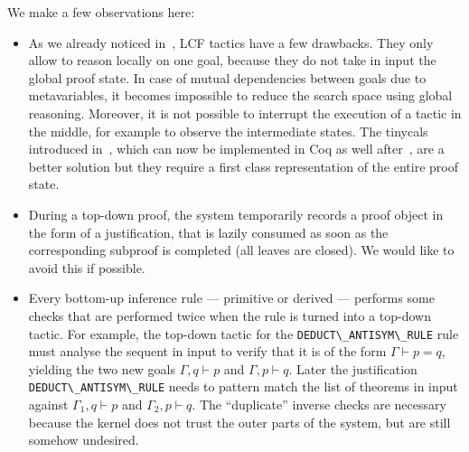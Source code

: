 \documentclass[preprint]{sigplanconf}
\begin{document}
We make a few observations here:
\begin{itemize}
\item As we already noticed in~\cite{??}, LCF tactics have a few drawbacks. They only allow to reason locally on one goal, because they do not take in input the global proof state. In case of mutual dependencies between goals due to metavariables, it becomes impossible to reduce the search space using global reasoning. Moreover, it is not possible to interrupt the execution of a tactic in the middle, for example to observe the intermediate states. The tinycals introduced in~\cite{??}, which can now be implemented in Coq as well after~\cite{??}, are a better solution but they require a first class representation of the entire proof state.
\item During a top-down proof, the system temporarily records a proof object in the form of a justification, that is lazily consumed as soon as the corresponding subproof is completed (all leaves are closed). We would like to avoid this if possible.
\item Every bottom-up inference rule --- primitive or derived --- performs some checks that are performed twice when the rule is turned into a top-down tactic.
For example, the top-down tactic for the \verb+DEDUCT\_ANTISYM\_RULE+ rule must analyse the sequent in input to verify that it is of the form $\Gamma \vdash p=q$, yielding the two new goals $\Gamma, q \vdash p$ and $\Gamma, p \vdash q$. Later the justification \verb+DEDUCT\_ANTISYM\_RULE+ needs to pattern match the list of theorems in input against $\Gamma_1,q \vdash p$ and $\Gamma_2,p \vdash q$. The ``duplicate'' inverse checks are necessary because the kernel does not trust the outer parts of the system, but are still somehow undesired.
\end{itemize}
\end{document}
